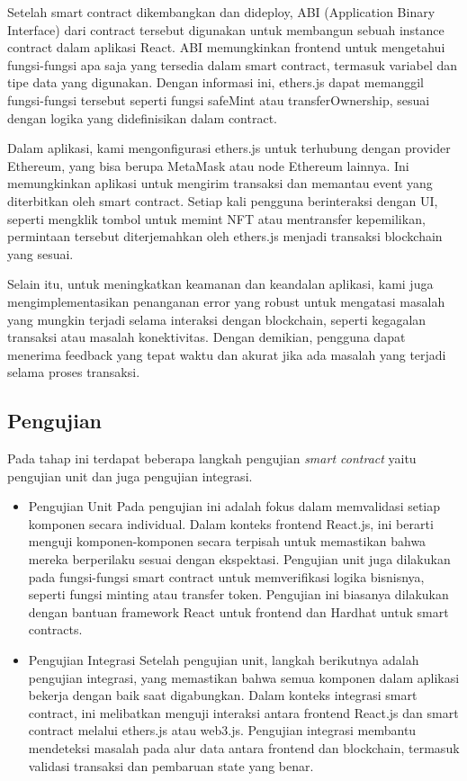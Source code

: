 Setelah smart contract dikembangkan dan dideploy, ABI (Application Binary Interface) dari contract tersebut digunakan untuk membangun sebuah instance contract dalam aplikasi React. ABI memungkinkan frontend untuk mengetahui fungsi-fungsi apa saja yang tersedia dalam smart contract, termasuk variabel dan tipe data yang digunakan. Dengan informasi ini, ethers.js dapat memanggil fungsi-fungsi tersebut seperti fungsi safeMint atau transferOwnership, sesuai dengan logika yang didefinisikan dalam contract.

Dalam aplikasi, kami mengonfigurasi ethers.js untuk terhubung dengan provider Ethereum, yang bisa berupa MetaMask atau node Ethereum lainnya. Ini memungkinkan aplikasi untuk mengirim transaksi dan memantau event yang diterbitkan oleh smart contract. Setiap kali pengguna berinteraksi dengan UI, seperti mengklik tombol untuk memint NFT atau mentransfer kepemilikan, permintaan tersebut diterjemahkan oleh ethers.js menjadi transaksi blockchain yang sesuai.

Selain itu, untuk meningkatkan keamanan dan keandalan aplikasi, kami juga mengimplementasikan penanganan error yang robust untuk mengatasi masalah yang mungkin terjadi selama interaksi dengan blockchain, seperti kegagalan transaksi atau masalah konektivitas. Dengan demikian, pengguna dapat menerima feedback yang tepat waktu dan akurat jika ada masalah yang terjadi selama proses transaksi.

\subsection{Pengujian}
Pada tahap ini terdapat beberapa langkah pengujian \emph{smart contract} yaitu pengujian unit dan juga pengujian integrasi.

\begin{itemize}
    \item Pengujian Unit
    Pada pengujian ini adalah fokus dalam memvalidasi setiap komponen secara individual. Dalam konteks frontend React.js, ini berarti menguji komponen-komponen secara terpisah untuk memastikan bahwa mereka berperilaku sesuai dengan ekspektasi. Pengujian unit juga dilakukan pada fungsi-fungsi smart contract untuk memverifikasi logika bisnisnya, seperti fungsi minting atau transfer token. Pengujian ini biasanya dilakukan dengan bantuan framework React untuk frontend dan  Hardhat untuk smart contracts.

    \item Pengujian Integrasi
    Setelah pengujian unit, langkah berikutnya adalah pengujian integrasi, yang memastikan bahwa semua komponen dalam aplikasi bekerja dengan baik saat digabungkan. Dalam konteks integrasi smart contract, ini melibatkan menguji interaksi antara frontend React.js dan smart contract melalui ethers.js atau web3.js. Pengujian integrasi membantu mendeteksi masalah pada alur data antara frontend dan blockchain, termasuk validasi transaksi dan pembaruan state yang benar.
\end{itemize}
